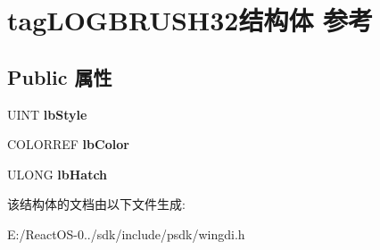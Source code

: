 \hypertarget{structtag_l_o_g_b_r_u_s_h32}{}\section{tag\+L\+O\+G\+B\+R\+U\+S\+H32结构体 参考}
\label{structtag_l_o_g_b_r_u_s_h32}
\subsection*{Public 属性}
\begin{DoxyCompactItemize}
\item 
\mbox{\label{structtag_l_o_g_b_r_u_s_h32_ad71bc82c191daf13c658d0572040a963}} 
U\+I\+NT {\bfseries lb\+Style}
\item 
\mbox{\label{structtag_l_o_g_b_r_u_s_h32_af7af4b7a19bdd7fe0006b2e801756000}} 
C\+O\+L\+O\+R\+R\+EF {\bfseries lb\+Color}
\item 
\mbox{\label{structtag_l_o_g_b_r_u_s_h32_a80216b866550f2586fdd36be3f4cda9b}} 
U\+L\+O\+NG {\bfseries lb\+Hatch}
\end{DoxyCompactItemize}


该结构体的文档由以下文件生成\+:\begin{DoxyCompactItemize}
\item 
E\+:/\+React\+O\+S-\/0../sdk/include/psdk/wingdi.\+h\end{DoxyCompactItemize}

